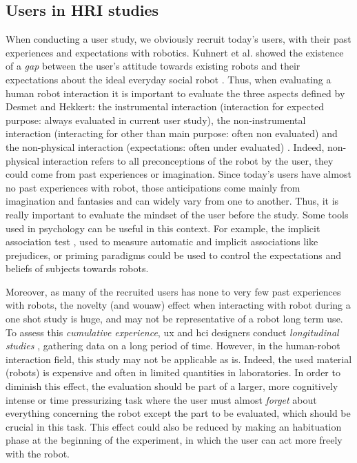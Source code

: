 \documentclass[a4paper,11pt,twoside]{StyleThese}
\begin{document}
\subsection{Users in HRI studies}
When conducting a user study, we obviously recruit today's users, with their past experiences and expectations with robotics. Kuhnert et al. showed the existence of a \textit{gap} between the user's attitude towards existing robots and their expectations about the  ideal everyday social robot \cite{kuhnert2017gap}. Thus, when evaluating a human robot interaction it is important to evaluate the three aspects defined by Desmet and Hekkert: the instrumental interaction (interaction for expected purpose: always evaluated in current user study), the non-instrumental interaction (interacting for other than main purpose: often non evaluated) and the non-physical interaction (expectations: often under evaluated) \cite{desmet2007framework}. Indeed, non-physical interaction refers to all preconceptions of the robot by the user, they could come from past experiences or imagination. Since today's users have almost no past experiences with robot, those anticipations come mainly from imagination and fantasies and can widely vary from one to another. Thus, it is really important to evaluate the mindset of the user before the study. Some tools used in psychology can be useful in this context. For example, the implicit association test \cite{greenwald1998measuring}, used to measure automatic and implicit associations like prejudices, or priming paradigms could be used to control the expectations and beliefs of subjects towards robots.

Moreover, as many of the recruited users has none to very few past experiences with robots, the novelty (and wouaw) effect when interacting with robot during a one shot study is huge, and may not be representative of a robot long term use. To assess this \textit{cumulative experience}, \acrfull{ux} and \acrfull{hci} designers conduct \textit{longitudinal studies} \cite{lazar2017research}, gathering data on a long period of time. However, in the human-robot interaction field, this study may not be applicable as is. Indeed, the used material (robots) is expensive and often in limited quantities in laboratories. In order to diminish this effect, the evaluation should be part of a larger, more cognitively intense or time pressurizing task where the user must almost \textit{forget} about everything concerning the robot except the part to be evaluated, which should be crucial in this task. This effect could also be reduced by making an habituation phase at the beginning of the experiment, in which the user can act more freely with the robot.
\end{document}

